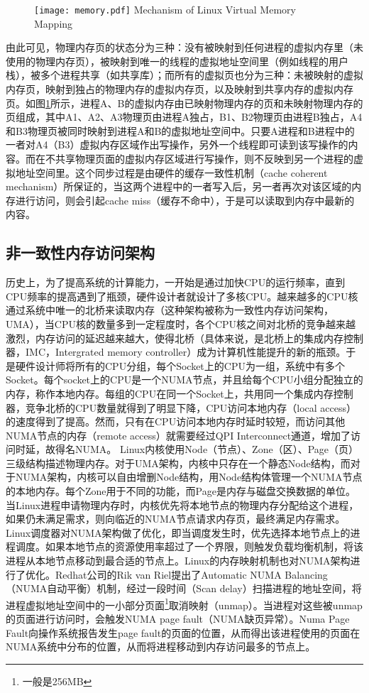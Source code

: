 \begin{figure}[!htp]
  \centering
  \texttt{[image: memory.pdf]}
    {Mechanism of Linux Virtual Memory Mapping}
  \label{fig:MEM}
\end{figure}

由此可见，物理内存页的状态分为三种：没有被映射到任何进程的虚拟内存里（未使用的物理内存页），被映射到唯一的线程的虚拟地址空间里（例如线程的用户栈），被多个进程共享（如共享库）；而所有的虚拟页也分为三种：未被映射的虚拟内存页，映射到独占的物理内存的虚拟内存页，以及映射到共享内存的虚拟内存页。如图\ref{fig:MEM}所示，进程A、B的虚拟内存由已映射物理内存的页和未映射物理内存的页组成，其中A1、A2、A3物理页由进程A独占，B1、B2物理页由进程B独占，A4和B3物理页被同时映射到进程A和B的虚拟地址空间中。只要A进程和B进程中的一者对A4（B3）虚拟内存区域作出写操作，另外一个线程即可读到该写操作的内容。而在不共享物理页面的虚拟内存区域进行写操作，则不反映到另一个进程的虚拟地址空间里。这个同步过程是由硬件的缓存一致性机制（cache coherent mechanism）所保证的，当这两个进程中的一者写入后，另一者再次对该区域的内存进行访问，则会引起cache miss（缓存不命中），于是可以读取到内存中最新的内容。

\subsection{非一致性内存访问架构}
历史上，为了提高系统的计算能力，一开始是通过加快CPU的运行频率，直到CPU频率的提高遇到了瓶颈，硬件设计者就设计了多核CPU。越来越多的CPU核通过系统中唯一的北桥来读取内存（这种架构被称为一致性内存访问架构，UMA），当CPU核的数量多到一定程度时，各个CPU核之间对北桥的竞争越来越激烈，内存访问的延迟越来越大，使得北桥（具体来说，是北桥上的集成内存控制器，IMC，Intergrated memory controller）成为计算机性能提升的新的瓶颈。于是硬件设计师将所有的CPU分组，每个Socket上的CPU为一组，系统中有多个Socket。每个socket上的CPU是一个NUMA节点，并且给每个CPU小组分配独立的内存，称作本地内存。每组的CPU在同一个Socket上，共用同一个集成内存控制器，竞争北桥的CPU数量就得到了明显下降，CPU访问本地内存（local access）的速度得到了提高。然而，只有在CPU访问本地内存时延时较短，而访问其他NUMA节点的内存（remote access）就需要经过QPI Interconnect通道，增加了访问时延，故得名NUMA。
\label{chap:memm}
Linux内核使用Node（节点）、Zone（区）、Page（页）三级结构描述物理内存\cite{phymem}。对于UMA架构，内核中只存在一个静态Node结构，而对于NUMA架构，内核可以自由增删Node结构，用Node结构体管理一个NUMA节点的本地内存。每个Zone用于不同的功能，而Page是内存与磁盘交换数据的单位。当Linux进程申请物理内存时，内核优先将本地节点的物理内存分配给这个进程，如果仍未满足需求，则向临近的NUMA节点请求内存页，最终满足内存需求。Linux调度器对NUMA架构做了优化，即当调度发生时，优先选择本地节点上的进程调度。如果本地节点的资源使用率超过了一个界限，则触发负载均衡机制，将该进程从本地节点移动到最合适的节点上。Linux的内存映射机制也对NUMA架构进行了优化。Redhat公司的Rik van Riel提出了Automatic NUMA Balancing（NUMA自动平衡）机制\cite{balancing}，经过一段时间（Scan delay）扫描进程的地址空间，将进程虚拟地址空间中的一小部分页面\footnote{一般是256MB}取消映射（unmap）。当进程对这些被unmap的页面进行访问时，会触发NUMA page fault（NUMA缺页异常）。Numa Page Fault向操作系统报告发生page fault的页面的位置，从而得出该进程使用的页面在NUMA系统中分布的位置，从而将进程移动到内存访问最多的节点上。

